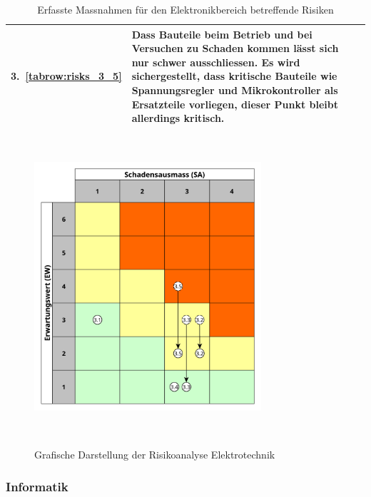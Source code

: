\documentclass[main.tex]{subfiles} %
\begin{document}
\begin{table}[H]
\begin{tabularx}{\textwidth}{|>{\centering\arraybackslash}p{2cm}|>{\raggedright\arraybackslash}X|>{\centering\arraybackslash}p{0.75cm}|}
        \rowcolor{yellow!30}
        3.~\ref{tabrow:risks_3_5} & Dass Bauteile beim Betrieb und bei Versuchen zu Schaden kommen lässt sich nur schwer ausschliessen. Es wird sichergestellt, dass kritische Bauteile wie Spannungsregler und Mikrokontroller als Ersatzteile vorliegen, dieser Punkt bleibt allerdings kritisch.
                                  & 2                                                                                                                                                                                                                                                                                                                                            \\
        \hline
    \end{tabularx}
    \caption{Erfasste Massnahmen für den Elektronikbereich betreffende Risiken}~\label{tab:Erfasste_Massnahmen_elektro}
\end{table}

\begin{figure}[H]
    \centering
    \includegraphics[width=0.75\textwidth]{./fig_Projektmanagement/Diagramm_Risiko_elektro.pdf}
    \caption{Grafische Darstellung der Risikoanalyse Elektrotechnik}~\label{fig:Diagramm_Risiko_elektro}
\end{figure}


\subsubsection*{Informatik}
\end{document}
